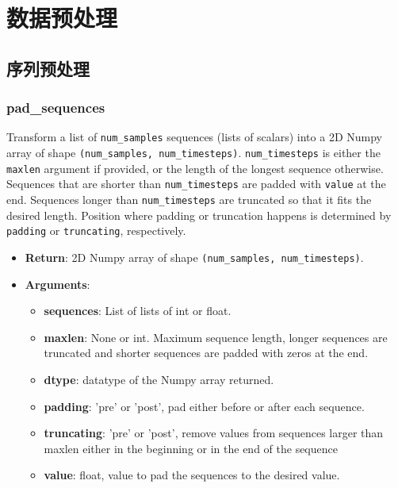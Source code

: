 \section{数据预处理}
\subsection{序列预处理}
\subsubsection{pad\_sequences}\label{preprocessing-sequence}

\begin{Shaded}
\begin{Highlighting}[]
\OperatorTok{=}\OperatorTok{=}\NormalTok{,}
    \OperatorTok{=}\OperatorTok{=}\OperatorTok{=}
\end{Highlighting}
\end{Shaded}

Transform a list of \texttt{num\_samples} sequences (lists of scalars)
into a 2D Numpy array of shape \texttt{(num\_samples,\ num\_timesteps)}.
\texttt{num\_timesteps} is either the \texttt{maxlen} argument if
provided, or the length of the longest sequence otherwise. Sequences
that are shorter than \texttt{num\_timesteps} are padded with
\texttt{value} at the end. Sequences longer than \texttt{num\_timesteps}
are truncated so that it fits the desired length. Position where padding
or truncation happens is determined by \texttt{padding} or
\texttt{truncating}, respectively.

\begin{itemize}
\item
  \textbf{Return}: 2D Numpy array of shape
  \texttt{(num\_samples,\ num\_timesteps)}.
\item
  \textbf{Arguments}:

  \begin{itemize}
  \tightlist
  \item
    \textbf{sequences}: List of lists of int or float.
  \item
    \textbf{maxlen}: None or int. Maximum sequence length, longer
    sequences are truncated and shorter sequences are padded with zeros
    at the end.
  \item
    \textbf{dtype}: datatype of the Numpy array returned.
  \item
    \textbf{padding}: 'pre' or 'post', pad either before or after each
    sequence.
  \item
    \textbf{truncating}: 'pre' or 'post', remove values from sequences
    larger than maxlen either in the beginning or in the end of the
    sequence
  \item
    \textbf{value}: float, value to pad the sequences to the desired
    value.
  \end{itemize}
\end{itemize}

